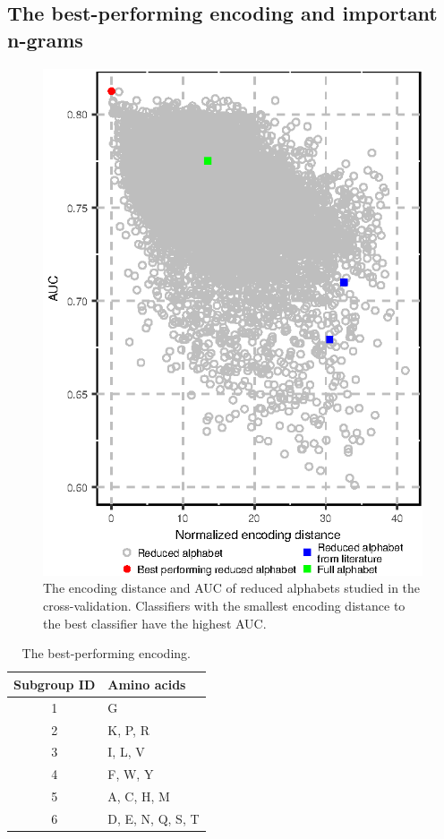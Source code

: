 \documentclass[a4,center,fleqn]{NAR}
\begin{document}
\subsection{The best-performing encoding and important n-grams}

\begin{figure}[!tpb]
\centerline{\includegraphics{figures/ed_AUC.eps}}
\caption{The encoding distance and AUC of reduced alphabets studied in the 
cross-validation. 
Classifiers with the smallest encoding distance to the best classifier have 
the highest AUC.}\label{fig:ed_AUC}
\end{figure}

\begin{table}[ht]
\centering
\caption{The best-performing encoding.} 
\label{tab:best_enc}
\begin{tabular}{cl}
\toprule
Subgroup ID & Amino acids \\ 
\midrule
  1 & G \\ 
\rowcolor[gray]{0.85}  2 & K, P, R \\ 
3 & I, L, V \\ 
\rowcolor[gray]{0.85}  4 & F, W, Y \\ 
5 & A, C, H, M \\ 
\rowcolor[gray]{0.85}  6 & D, E, N, Q, S, T \\ 
\bottomrule
\end{tabular}
\end{table}
\end{document}
